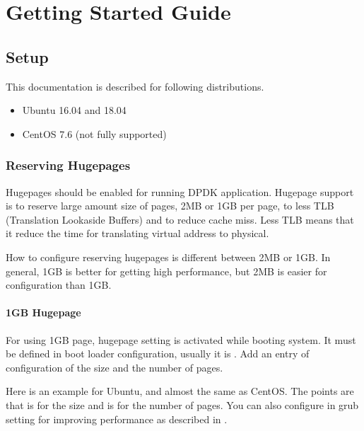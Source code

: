 \documentclass[a4paper,11pt,openany,oneside,english]{sphinxmanual}
\begin{document}
\chapter{Getting Started Guide}
\label{\detokenize{gsg/index:getting-started-guide}}\label{\detokenize{gsg/index::doc}}

\section{Setup}
\label{\detokenize{gsg/setup:setup}}\label{\detokenize{gsg/setup:gsg-setup}}\label{\detokenize{gsg/setup::doc}}
This documentation is described for following distributions.
\begin{itemize}
\item {} 
Ubuntu 16.04 and 18.04

\item {} 
CentOS 7.6 (not fully supported)

\end{itemize}


\subsection{Reserving Hugepages}
\label{\detokenize{gsg/setup:reserving-hugepages}}\label{\detokenize{gsg/setup:gsg-reserve-hugep}}
Hugepages should be enabled for running DPDK application.
Hugepage support is to reserve large amount size of pages,
2MB or 1GB per page, to less TLB (Translation Lookaside Buffers) and
to reduce cache miss.
Less TLB means that it reduce the time for translating virtual address
to physical.

How to configure reserving hugepages is different between 2MB or 1GB.
In general, 1GB is better for getting high performance,
but 2MB is easier for configuration than 1GB.


\subsubsection{1GB Hugepage}
\label{\detokenize{gsg/setup:gb-hugepage}}
For using 1GB page, hugepage setting is activated while booting system.
It must be defined in boot loader configuration, usually it is
.
Add an entry of configuration of the size and the number of pages.

Here is an example for Ubuntu, and almost the same as CentOS. The points are
that  is for the size and  is for the number of
pages.
You can also configure  in grub setting for improving performance
as described in
{\hyperref[\detokenize{gsg/performance_opt:gsg-performance-opt}]{}}.
\end{document}
